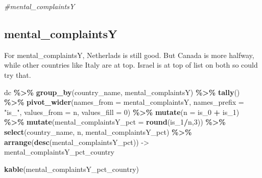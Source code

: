 \documentclass[
]{article}
\newenvironment{Shaded}{\begin{snugshade}}{\end{snugshade}}
\newcommand{\AttributeTok}[1]{\textcolor[rgb]{0.13,0.29,0.53}{#1}}
\newcommand{\CommentTok}[1]{\textcolor[rgb]{0.56,0.35,0.01}{\textit{#1}}}
\newcommand{\DecValTok}[1]{\textcolor[rgb]{0.00,0.00,0.81}{#1}}
\newcommand{\FunctionTok}[1]{\textcolor[rgb]{0.13,0.29,0.53}{\textbf{#1}}}
\newcommand{\NormalTok}[1]{#1}
\newcommand{\OtherTok}[1]{\textcolor[rgb]{0.56,0.35,0.01}{#1}}
\newcommand{\SpecialCharTok}[1]{\textcolor[rgb]{0.81,0.36,0.00}{\textbf{#1}}}
\newcommand{\StringTok}[1]{\textcolor[rgb]{0.31,0.60,0.02}{#1}}
\begin{document}
\begin{Shaded}
\begin{Highlighting}[]
\CommentTok{\#mental\_complaintsY   }
\end{Highlighting}
\end{Shaded}

\subsection{mental\_complaintsY}\label{mental_complaintsy}

For mental\_complaintsY, Netherlads is still good. But Canada is more
halfway, while other countries like Italy are at top. Israel is at top
of list on both so could try that.

\begin{Shaded}
\begin{Highlighting}[]
\NormalTok{dc }\SpecialCharTok{\%\textgreater{}\%}
  \FunctionTok{group\_by}\NormalTok{(country\_name, mental\_complaintsY) }\SpecialCharTok{\%\textgreater{}\%}
  \FunctionTok{tally}\NormalTok{() }\SpecialCharTok{\%\textgreater{}\%}
  \FunctionTok{pivot\_wider}\NormalTok{(}\AttributeTok{names\_from =}\NormalTok{ mental\_complaintsY,}
              \AttributeTok{names\_prefix =} \StringTok{"is\_"}\NormalTok{,}
              \AttributeTok{values\_from =}\NormalTok{ n,}
              \AttributeTok{values\_fill =} \DecValTok{0}\NormalTok{) }\SpecialCharTok{\%\textgreater{}\%}
  \FunctionTok{mutate}\NormalTok{(}\AttributeTok{n =}\NormalTok{ is\_0 }\SpecialCharTok{+}\NormalTok{ is\_1) }\SpecialCharTok{\%\textgreater{}\%}
  \FunctionTok{mutate}\NormalTok{(}\AttributeTok{mental\_complaintsY\_pct =} \FunctionTok{round}\NormalTok{(is\_1}\SpecialCharTok{/}\NormalTok{n,}\DecValTok{3}\NormalTok{)) }\SpecialCharTok{\%\textgreater{}\%}
  \FunctionTok{select}\NormalTok{(country\_name, n, mental\_complaintsY\_pct) }\SpecialCharTok{\%\textgreater{}\%}
  \FunctionTok{arrange}\NormalTok{(}\FunctionTok{desc}\NormalTok{(mental\_complaintsY\_pct)) }\OtherTok{{-}\textgreater{}}\NormalTok{ mental\_complaintsY\_pct\_country}

\FunctionTok{kable}\NormalTok{(mental\_complaintsY\_pct\_country)}
\end{Highlighting}
\end{Shaded}
\end{document}
